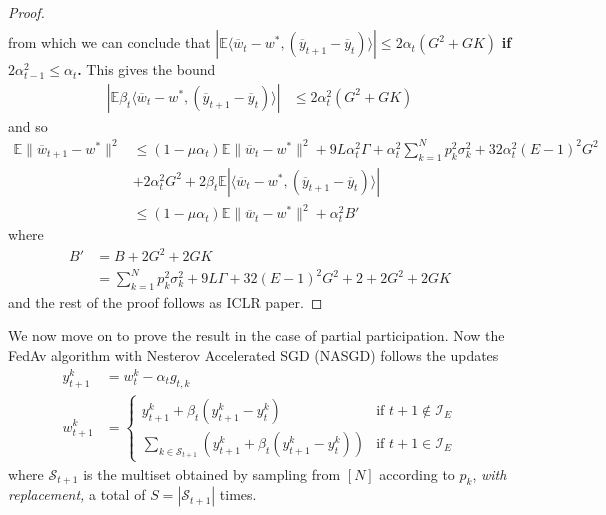 \begin{proof}
\begin{align*}
	\end{align*}
	from which we can conclude that $|\mathbb{E}\langle\overline{w}_{t}-w^{\ast},(\overline{y}_{t+1}-\overline{y}_{t})\rangle|\leq2\alpha_{t}(G^{2}+GK)$\textbf{
		if $2\alpha_{t-1}^{2}\leq\alpha_{t}$.} This gives the bound
	\begin{align*}
	|\mathbb{E}\beta_{t}\langle\overline{w}_{t}-w^{\ast},(\overline{y}_{t+1}-\overline{y}_{t})\rangle| & \leq2\alpha_{t}^{2}(G^{2}+GK)
	\end{align*}
	and so
	\begin{align*}
	\mathbb{E}\|\overline{w}_{t+1}-w^{\ast}\|^{2} & \leq(1-\mu\alpha_{t})\mathbb{E}\|\overline{w}_{t}-w^{\ast}\|^{2}+9L\alpha_{t}^{2}\Gamma+\alpha_{t}^{2}\sum_{k=1}^{N}p_{k}^{2}\sigma_{k}^{2}+32\alpha_{t}^{2}(E-1)^{2}G^{2}\\
	& +2\alpha_{t}^{2}G^{2}+2\beta_{t}\mathbb{E}|\langle\overline{w}_{t}-w^{\ast},(\overline{y}_{t+1}-\overline{y}_{t})\rangle|\\
	& \leq(1-\mu\alpha_{t})\mathbb{E}\|\overline{w}_{t}-w^{\ast}\|^{2}+\alpha_{t}^{2}B'
	\end{align*}
	where 
	\begin{align*}
	B' & =B+2G^{2}+2GK\\
	& =\sum_{k=1}^{N}p_{k}^{2}\sigma_{k}^{2}+9L\Gamma+32(E-1)^{2}G^{2}+2+2G^{2}+2GK
	\end{align*}
	and the rest of the proof follows as ICLR paper. 
\end{proof}
%
We now move on to prove the result in the case of partial participation.
Now the FedAv algorithm with Nesterov Accelerated SGD (NASGD) follows
the updates
\begin{align*}
y_{t+1}^{k} & =w_{t}^{k}-\alpha_{t}g_{t,k}\\
w_{t+1}^{k} & =\begin{cases}
y_{t+1}^{k}+\beta_{t}(y_{t+1}^{k}-y_{t}^{k}) & \text{if }t+1\notin\mathcal{I}_{E}\\
\sum_{k\in\mathcal{S}_{t+1}}\left(y_{t+1}^{k}+\beta_{t}(y_{t+1}^{k}-y_{t}^{k})\right) & \text{if }t+1\in\mathcal{I}_{E}
\end{cases}
\end{align*}
where $\mathcal{S}_{t+1}$ is the multiset obtained by sampling from
$[N]$ according to $p_{k}$, \emph{with replacement, }a total of
$S=|\mathcal{S}_{t+1}|$ times. 

